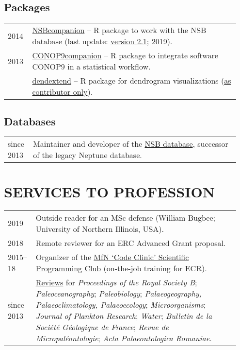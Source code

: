 \documentclass[11pt, a4paper]{article}
\begin{document}
\subsection{Packages}
\begin{longtable}{p{0.1\linewidth} P{0.85\linewidth}}
2014 & \href{http://github.com/plannapus/NSBcompanion}{NSBcompanion} -- R package to work with the NSB database (last update: \href{http://doi.org/10.5281/zenodo.3408198}{version 2.1}; 2019).\\
2013 & \href{http://github.com/plannapus/CONOP9companion}{CONOP9companion} -- R package to integrate software CONOP9 in a statistical workflow.\\
     & \href{https://cran.r-project.org/web/packages/dendextend/index.html}{dendextend} -- R package for dendrogram visualizations (\underline{as contributor only}).\\
\end{longtable}
\subsection{Databases}
\begin{longtable}{p{0.1\linewidth} P{0.85\linewidth}}
since 2013 & Maintainer and developer of the \href{http://nsb-mfn-berlin.de/}{NSB database}, successor of the legacy Neptune database.\\
\end{longtable}

\section{SERVICES TO PROFESSION}
\begin{longtable}{p{0.1\linewidth} P{0.85\linewidth}}
2019 & Outside reader for an MSc defense (William Bugbee; University of Northern Illinois, USA).\\
2018 & Remote reviewer for an ERC Advanced Grant proposal.\\
2015--18 & Organizer of the \href{https://github.com/plannapus/MfN-Code-Clinic}{MfN `Code Clinic' Scientific Programming Club} (on-the-job training for ECR). \\
since 2013 & \href{http://publons.com/a/1291154/}{Reviews} for \textit{Proceedings of the Royal Society B}; \textit{Paleoceanography}; \textit{Paleobiology}; \textit{Palaeogeography, Palaeoclimatology, Palaeoecology}; \textit{Microorganisms}; \textit{Journal of Plankton Research}; \textit{Water}; \textit{Bulletin de la Soci\'{e}t\'{e} G\'{e}ologique de France}; \textit{Revue de Micropal\'{e}ontologie}; \textit{Acta Palaeontologica Romaniae}. \\
\end{longtable}
\end{document}
